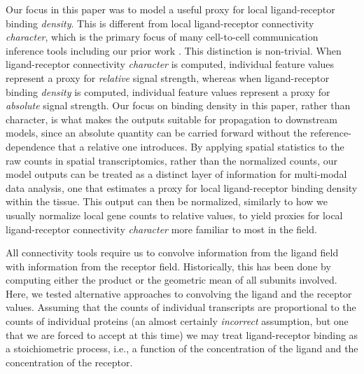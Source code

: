\documentclass[10pt,letterpaper]{article}
\begin{document}
Our focus in this paper was to model a useful proxy for local ligand-receptor binding \textit{density}. This is different from local ligand-receptor connectivity \textit{character}, which is the primary focus of many cell-to-cell communication inference tools including our prior work \cite{Raredon2022}. This distinction is non-trivial. When ligand-receptor connectivity \textit{character} is computed, individual feature values represent a proxy for \textit{relative} signal strength, whereas when ligand-receptor binding \textit{density} is computed, individual feature values represent a proxy for \textit{absolute} signal strength. Our focus on binding density in this paper, rather than character, is what makes the outputs suitable for propagation to downstream models, since an absolute quantity can be carried forward without the reference-dependence that a relative one introduces. By applying spatial statistics to the raw counts in spatial transcriptomics, rather than the normalized counts, our model outputs can be treated as a distinct layer of information for multi-modal data analysis, one that estimates a proxy for local ligand-receptor binding density within the tissue. This output can then be normalized, similarly to how we usually normalize local gene counts to relative values, to yield proxies for local ligand-receptor connectivity \textit{character} more familiar to most in the field.

All connectivity tools require us to convolve information from the ligand field with information from the receptor field. Historically, this has been done by computing either the product \cite{Raredon2022} or the geometric mean \cite{Wilk2024} of all subunits involved. Here, we tested alternative approaches to convolving the ligand and the receptor values. Assuming that the counts of individual transcripts are proportional to the counts of individual proteins (an almost certainly \textit{incorrect} assumption, but one that we are forced to accept at this time) we may treat ligand-receptor binding as a stoichiometric process, i.e., a function of the concentration of the ligand and the concentration of the receptor.
\end{document}
